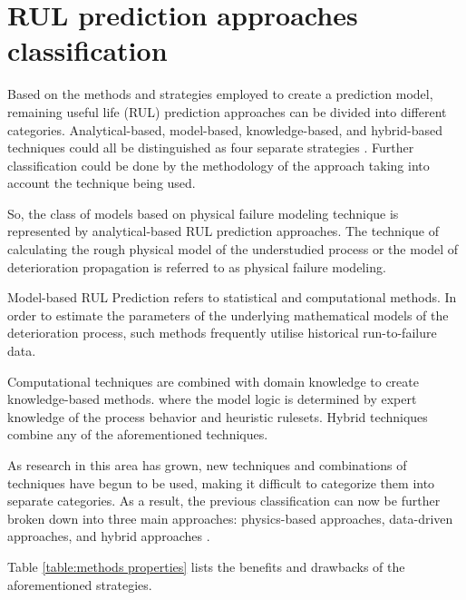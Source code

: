 \section{RUL prediction approaches classification}  

Based on the methods and strategies employed to create a prediction model, remaining useful life (RUL) prediction approaches can be divided into different categories. Analytical-based, model-based, knowledge-based, and hybrid-based techniques could all be distinguished as four separate strategies \cite{OKOH2014158}. Further classification could be done by the methodology of the approach taking into account the technique being used.

So, the class of models based on physical failure modeling technique is represented by analytical-based RUL prediction approaches. The technique of calculating the rough physical model of the understudied process or the model of deterioration propagation is referred to as physical failure modeling.

Model-based RUL Prediction refers to statistical and computational methods. In order to estimate the parameters of the underlying mathematical models of the deterioration process, such methods frequently utilise historical run-to-failure data.

Computational techniques are combined with domain knowledge to create knowledge-based methods. where the model logic is determined by expert knowledge of the process behavior and heuristic rulesets.
Hybrid techniques combine any of the aforementioned techniques.

As research in this area has grown, new techniques and combinations of techniques have begun to be used, making it difficult to categorize them into separate categories. As a result, the previous classification can now be further broken down into three main approaches: physics-based approaches, data-driven approaches, and hybrid approaches \cite{WANG202081}.

Table \ref{table:methods properties} lists the benefits and drawbacks of the aforementioned strategies.

